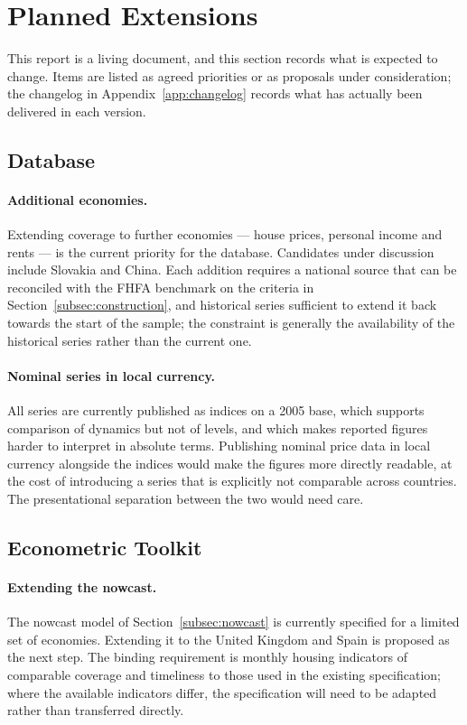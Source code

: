\section{Planned Extensions}
\label{sec:roadmap}

This report is a living document, and this section records what is expected
to change. Items are listed as agreed priorities or as proposals under
consideration; the changelog in Appendix~\ref{app:changelog} records what has
actually been delivered in each version.

\subsection{Database}

\paragraph{Additional economies.}
Extending coverage to further economies --- house prices, personal income and
rents --- is the current priority for the database. Candidates under
discussion include Slovakia and China. Each addition requires a national
source that can be reconciled with the FHFA benchmark on the criteria in
Section~\ref{subsec:construction}, and historical series sufficient to extend
it back towards the start of the sample; the constraint is generally the
availability of the historical series rather than the current one.

\paragraph{Nominal series in local currency.}
All series are currently published as indices on a 2005 base, which supports
comparison of dynamics but not of levels, and which makes reported figures
harder to interpret in absolute terms. Publishing nominal price data in local
currency alongside the indices would make the figures more directly readable,
at the cost of introducing a series that is explicitly not comparable across
countries. The presentational separation between the two would need care.

\subsection{Econometric Toolkit}

\paragraph{Extending the nowcast.}
The nowcast model of Section~\ref{subsec:nowcast} is currently specified for
a limited set of economies. Extending it to the United Kingdom and Spain is
proposed as the next step. The binding requirement is monthly housing
indicators of comparable coverage and timeliness to those used in the
existing specification; where the available indicators differ, the
specification will need to be adapted rather than transferred directly.

